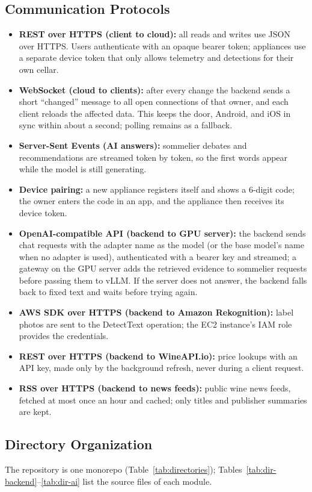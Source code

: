 \documentclass[conference]{IEEEtran}
\begin{document}
\subsection{Communication Protocols}
\begin{itemize}
    \item \textbf{REST over HTTPS (client to cloud):} all reads and writes use JSON over HTTPS. Users authenticate with an opaque bearer token; appliances use a separate device token that only allows telemetry and detections for their own cellar.
    \item \textbf{WebSocket (cloud to clients):} after every change the backend sends a short ``changed'' message to all open connections of that owner, and each client reloads the affected data. This keeps the door, Android, and iOS in sync within about a second; polling remains as a fallback.
    \item \textbf{Server-Sent Events (AI answers):} sommelier debates and recommendations are streamed token by token, so the first words appear while the model is still generating.
    \item \textbf{Device pairing:} a new appliance registers itself and shows a 6-digit code; the owner enters the code in an app, and the appliance then receives its device token.
    \item \textbf{OpenAI-compatible API (backend to GPU server):} the backend sends chat requests with the adapter name as the model (or the base model's name when no adapter is used), authenticated with a bearer key and streamed; a gateway on the GPU server adds the retrieved evidence to sommelier requests before passing them to vLLM. If the server does not answer, the backend falls back to fixed text and waits before trying again.
    \item \textbf{AWS SDK over HTTPS (backend to Amazon Rekognition):} label photos are sent to the DetectText operation; the EC2 instance's IAM role provides the credentials.
    \item \textbf{REST over HTTPS (backend to WineAPI.io):} price lookups with an API key, made only by the background refresh, never during a client request.
    \item \textbf{RSS over HTTPS (backend to news feeds):} public wine news feeds, fetched at most once an hour and cached; only titles and publisher summaries are kept.
\end{itemize}

\subsection{Directory Organization}
The repository is one monorepo (Table~\ref{tab:directories}); Tables~\ref{tab:dir-backend}--\ref{tab:dir-ai} list the source files of each module.
\end{document}
